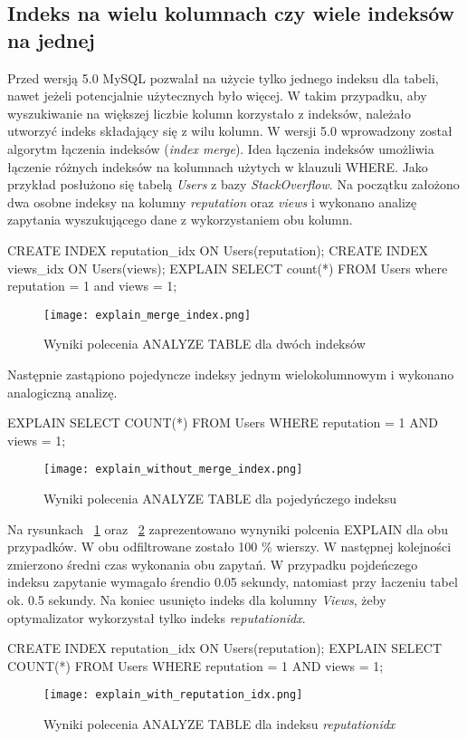 \subsection{Indeks na wielu kolumnach czy wiele indeksów na jednej}
Przed wersją 5.0 MySQL pozwalał na użycie tylko jednego indeksu dla tabeli, nawet jeżeli potencjalnie użytecznych było więcej. W takim przypadku, aby wyszukiwanie na większej liczbie kolumn korzystało z indeksów, należało utworzyć indeks składający się z wilu kolumn. W wersji 5.0 wprowadzony został algorytm łączenia indeksów (\textit{index merge}). Idea łączenia indeksów umożliwia łączenie różnych indeksów na kolumnach użytych w klauzuli WHERE. Jako przykład posłużono się tabelą \textit{Users} z bazy \textit{StackOverflow}. Na początku założono dwa osobne indeksy na kolumny \textit{reputation} oraz \textit{views} i wykonano analizę zapytania wyszukującego dane z wykorzystaniem obu kolumn.
\begin{spverbatim}
	CREATE INDEX reputation_idx ON Users(reputation);
	CREATE INDEX views_idx ON Users(views);
	EXPLAIN SELECT count(*) FROM Users where reputation = 1 and views = 1;
\end{spverbatim}
\begin{figure}
	\caption{Wyniki polecenia ANALYZE TABLE dla dwóch indeksów}
	\centering
	\texttt{[image: explain\_merge\_index.png]}
	\label{fig:explain_merge_index}
\end{figure}

Następnie zastąpiono pojedyncze indeksy jednym wielokolumnowym i wykonano analogiczną analizę.
\begin{spverbatim}
	EXPLAIN SELECT COUNT(*) FROM Users WHERE reputation = 1 AND views = 1;
\end{spverbatim}

\begin{figure}
	\caption{Wyniki polecenia ANALYZE TABLE dla pojedyńczego indeksu}
	\centering
	\texttt{[image: explain\_without\_merge\_index.png]}
	\label{fig:explain_without_merge_index}
\end{figure}

Na rysunkach ~\ref{fig:explain_merge_index} oraz ~\ref{fig:explain_without_merge_index} zaprezentowano wynyniki polcenia EXPLAIN dla obu przypadków. W obu odfiltrowane zostało 100 \% wierszy. W następnej kolejności zmierzono średni czas wykonania obu zapytań. W przypadku pojdeńczego indeksu zapytanie wymagało śrendio 0.05 sekundy, natomiast przy łaczeniu tabel ok. 0.5 sekundy. Na koniec usunięto indeks dla kolumny \textit{Views}, żeby optymalizator wykorzystał tylko indeks \textit{reputation\textunderscore idx}.
\begin{spverbatim}
	CREATE INDEX reputation_idx ON Users(reputation);
	EXPLAIN SELECT COUNT(*) FROM Users WHERE reputation = 1 AND views = 1;
\end{spverbatim}
\begin{figure}[h!]
	\centering
	\texttt{[image: explain\_with\_reputation\_idx.png]}
	\caption{Wyniki polecenia ANALYZE TABLE dla indeksu \textit{reputation\textunderscore idx}}
	\label{fig:explain_with_reputation_idx}
\end{figure}

